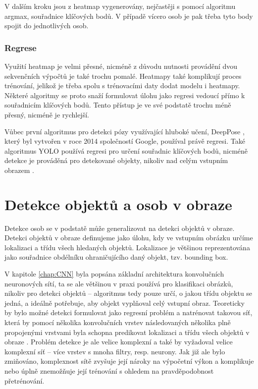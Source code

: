 V dalším kroku jsou z heatmap vygenerovány, nejčastěji s pomocí algoritmu
argmax, souřadnice klíčových bodů. V případě vícero osob je pak třeba tyto body
spojit do jednotlivých osob.

\subsubsection*{Regrese}

Využití heatmap je velmi přesné, nicméně z důvodu nutnosti provádění dvou
sekvenčních výpočtů je také trochu pomalé. Heatmapy také komplikují proces
trénování, jelikož je třeba spolu s trénovacími daty dodat modelu i heatmapy.
Některé algoritmy se proto snaží formulovat úlohu jako regresi vedoucí přímo k
souřadnicím klíčových bodů. Tento přístup je ve své podstatě trochu méně
přesný, nicméně je rychlejší.

Vůbec první algoritmus pro detekci pózy využívající hluboké učení, DeepPose
\cite{deeppose}, který byl vytvořen v roce 2014 společností Google, používal
právě regresi. Také algoritmus YOLO používá regresi pro určení souřadnic
klíčových bodů, nicméně detekce je prováděná pro detekované objekty, nikoliv
nad celým vstupním obrazem \cite{yolo-pose}.


\section{Detekce objektů a osob v obraze}
\label{sec:obj_det}

Detekce osob se v podstatě může generalizovat na detekci objektů v obraze.
Detekci objektů v obraze definujeme jako úlohu, kdy ve vstupním obrázku určíme
lokalizaci a třídu všech hledaných objektů. Lokalizace je většinou
reprezentována jako souřadnice obdélníku ohraničujícího daný objekt, tzv.
bounding box.

V kapitole \ref{chap:CNN} byla popsána základní architektura konvolučních
neuronových sítí, ta se ale většinou v praxi používá pro klasifikaci obrázků,
nikoliv pro detekci objektů – algoritmus tedy pouze určí, o jakou třídu objektu
se jedná, a ideálně potřebuje, aby objekt vyplňoval celý vstupní obraz.
Teoreticky by bylo možné detekci formulovat jako regresní problém a natrénovat
takovou síť, která by pomocí několika konvolučních vrstev následovaných
několika plně propojenými vrstvami byla schopna predikovat lokalizaci a třídu
všech objektů v obraze \cite{szegedy}. Problém detekce je ale velice komplexní
a také by vyžadoval velice komplexní síť – více vrstev s mnoha filtry, resp.
neurony. Jak již ale bylo zmiňováno, komplexnost sítě zvyšuje její nároky na
výpočetní výkon a komplikuje nebo úplně znemožňuje její trénování s ohledem na
pravděpodobnost přetrénování.

